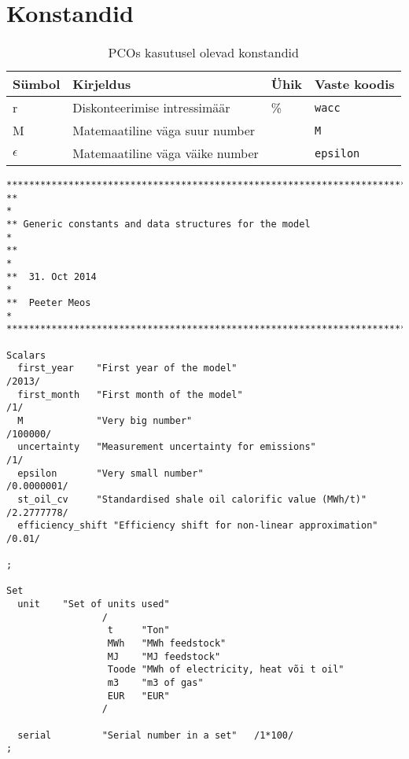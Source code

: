 \section{Konstandid}
\label{app:konstandid}

\begin{table}
\begin{tabular}{l l l l}
Sümbol & Kirjeldus & Ühik & Vaste koodis\\
\hline
r & Diskonteerimise intressimäär &  \%   & \texttt{wacc}  \\
M & Matemaatiline väga suur number & & \texttt{M} \\
$\epsilon$ & Matemaatiline väga väike number  & & \texttt{epsilon}
\end{tabular}
\caption{PCOs kasutusel olevad konstandid}
\end{table}

\begin{verbatim}
********************************************************************************
**                                                                             *
** Generic constants and data structures for the model                         *
**                                                                             *
**  31. Oct 2014                                                               *
**  Peeter Meos                                                                *
********************************************************************************

Scalars
  first_year    "First year of the model"                             /2013/
  first_month   "First month of the model"                            /1/
  M             "Very big number"                                     /100000/
  uncertainty   "Measurement uncertainty for emissions"               /1/
  epsilon       "Very small number"                                   /0.0000001/
  st_oil_cv     "Standardised shale oil calorific value (MWh/t)"      /2.2777778/
  efficiency_shift "Efficiency shift for non-linear approximation"    /0.01/

;

Set
  unit    "Set of units used"
                 /
                  t     "Ton"
                  MWh   "MWh feedstock"
                  MJ    "MJ feedstock"
                  Toode "MWh of electricity, heat või t oil"
                  m3    "m3 of gas"
                  EUR   "EUR"
                 /

  serial         "Serial number in a set"   /1*100/
;
\end{verbatim}